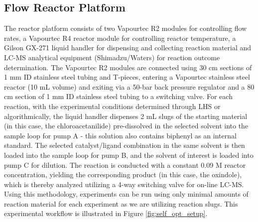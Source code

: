 \subsection{Flow Reactor Platform}

The reactor platform consists of two Vapourtec R2 modules for controlling flow rates, a Vapourtec R4 reactor module for controlling reactor temperature, a Gilson GX-271 liquid handler for dispensing and collecting reaction material and LC-MS analytical equipment (Shimadzu/Waters) for reaction outcome determination. The Vapourtec R2 modules are connected using 30 cm sections of 1 mm ID stainless steel tubing and T-pieces, entering a Vapourtec stainless steel reactor (10 mL volume) and exiting via a 50-bar back pressure regulator and a 80 cm section of 1 mm ID stainless steel tubing to a switching valve. For each reaction, with the experimental conditions determined through LHS or algorithmically, the liquid handler dispenses 2 mL slugs of the starting material (in this case, the chloroacetanilide) pre-dissolved in the selected solvent into the sample loop for pump A - this solution also contains biphenyl as an internal standard. The selected catalyst/ligand combination in the same solvent is then loaded into the sample loop for pump B, and the solvent of interest is loaded into pump C for dilution. The reaction is conducted with a constant 0.09 M reactor concentration, yielding the corresponding product (in this case, the oxindole), which is thereby analyzed utilizing a 4-way switching valve for on-line LC-MS. Using this methodology, experiments can be run using only minimal amounts of reaction material for each experiment as we are utilizing reaction slugs. This experimental workflow is illustrated in Figure \ref{fig:self_opt_setup}.

